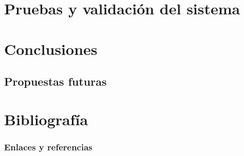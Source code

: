 \documentclass[a4paper, oneside, 12pt]{book}
\begin{document}
	\pagebreak
	
	\chapter{Pruebas y validación del sistema}
	
	\pagebreak
	
	\chapter{Conclusiones}
	
	\section{Propuestas futuras}
	
	\pagebreak
	
	\chapter{Bibliografía}
	
	\subsection*{Enlaces y referencias}
	
\end{document}
